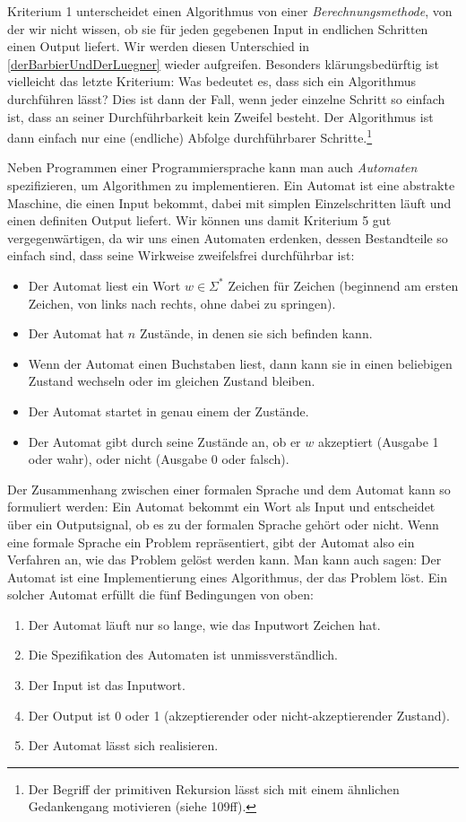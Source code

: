 Kriterium 1 unterscheidet einen Algorithmus von einer \emph{Berechnungsmethode},
von der wir nicht wissen,
ob sie für jeden gegebenen Input in endlichen Schritten einen Output liefert.
Wir werden diesen Unterschied in \autoref{derBarbierUndDerLuegner} wieder aufgreifen.
Besonders klärungsbedürftig ist vielleicht das letzte Kriterium:
Was bedeutet es, dass sich ein Algorithmus durchführen lässt?
Dies ist dann der Fall, wenn jeder einzelne Schritt so einfach ist,
dass an seiner Durchführbarkeit kein Zweifel besteht.
Der Algorithmus ist dann einfach nur eine (endliche)
Abfolge durchführbarer Schritte.\footnote{Der Begriff der primitiven Rekursion
lässt sich mit einem ähnlichen Gedankengang motivieren (siehe \cite{schoening} 109ff).}

Neben Programmen einer Programmiersprache kann man auch
\emph{Automaten} spezifizieren,
um Algorithmen zu implementieren.
Ein Automat ist eine abstrakte Maschine,
die einen Input bekommt, 
dabei mit simplen Einzelschritten läuft
und einen definiten Output liefert.
Wir können uns damit Kriterium 5 gut vergegenwärtigen,
da wir uns einen Automaten erdenken,
dessen Bestandteile so einfach sind,
dass seine Wirkweise zweifelsfrei durchführbar ist:

\begin{itemize}
    \item Der Automat liest ein Wort $w \in \Sigma^*$ Zeichen für Zeichen
        (beginnend am ersten Zeichen, von links nach rechts, ohne dabei zu springen).
    \item Der Automat hat $n$ Zustände, in denen sie sich befinden kann.
    \item Wenn der Automat einen Buchstaben liest,
        dann kann sie in einen beliebigen Zustand wechseln oder im gleichen Zustand bleiben.
    \item Der Automat startet in genau einem der Zustände.
    \item Der Automat gibt durch seine Zustände an,
        ob er $w$ akzeptiert (Ausgabe 1 oder wahr),
        oder nicht (Ausgabe 0 oder falsch).
\end{itemize}

Der Zusammenhang zwischen einer formalen Sprache und dem Automat kann so formuliert werden:
Ein Automat bekommt ein Wort als Input und entscheidet über ein Outputsignal,
ob es zu der formalen Sprache gehört oder nicht.
Wenn eine formale Sprache ein Problem repräsentiert,
gibt der Automat also ein Verfahren an, 
wie das Problem gelöst werden kann.
Man kann auch sagen:
Der Automat ist eine Implementierung eines Algorithmus,
der das Problem löst.
Ein solcher Automat erfüllt die fünf Bedingungen von oben:
\begin{enumerate}
    \item Der Automat läuft nur so lange, wie das Inputwort Zeichen hat.
    \item Die Spezifikation des Automaten ist unmissverständlich.  
    \item Der Input ist das Inputwort.
    \item Der Output ist 0 oder 1 (akzeptierender oder nicht-akzeptierender Zustand).
    \item Der Automat lässt sich realisieren. 
\end{enumerate}

